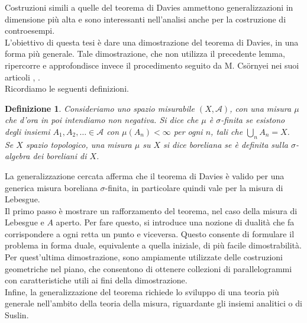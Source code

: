 \documentclass[a4paper, twoside]{article}
\newcommand{\<}{\langle}
\renewcommand{\>}{\rangle}
\newtheorem{defin}[teo]{Definizione}
\begin{document}
	Costruzioni simili a quelle del teorema di Davies ammettono generalizzazioni in dimensione più alta e sono interessanti nell'analisi anche per la costruzione di controesempi.\\
	L’obiettivo di questa tesi è dare una dimostrazione del teorema di Davies, in una forma più generale. Tale dimostrazione, che non utilizza il precedente lemma, ripercorre e approfondisce invece il procedimento seguito da M. Cs\"{o}rnyei nei suoi articoli \Cite{2}, \cite{3}.\\
	
	Ricordiamo le seguenti definizioni.
	\begin{defin}
	Consideriamo uno spazio misurabile $(X, \mathcal{A})$, con una misura $\mu$ che d'ora in poi intendiamo non negativa. Si dice che $\mu$ è $\sigma$-finita se esistono degli insiemi $A_{1},A_{2},\ldots \in {\mathcal {A}}$ con $\mu \left(A_{n}\right)<\infty $ per ogni $n$, tali che $\bigcup _{n}A_{n}=X$.\\
	Se $X$ spazio topologico, una misura $\mu$ su $X$ si dice boreliana se è definita sulla $\sigma$-algebra dei boreliani di $X$. 
	\end{defin}
	La generalizzazione cercata afferma che il teorema di Davies è valido per una generica misura boreliana $\sigma$-finita, in particolare quindi vale per la misura di Lebesgue.\\
	
	Il primo passo è mostrare un rafforzamento del teorema, nel caso della misura di Lebesgue e $A$ aperto. Per fare questo, si introduce una nozione di dualità che fa corrispondere a ogni retta un punto e viceversa. Questo consente di formulare il problema in forma duale, equivalente a quella iniziale, di più facile dimostrabilità.\\
	Per quest'ultima dimostrazione, sono ampiamente utilizzate delle costruzioni geometriche nel piano, che consentono di ottenere collezioni di parallelogrammi con caratteristiche utili ai fini della dimostrazione.\\
	Infine, la generalizzazione del teorema richiede lo sviluppo di una teoria più generale nell'ambito della teoria della misura, riguardante gli insiemi analitici o di Suslin.\\
	
\end{document}
